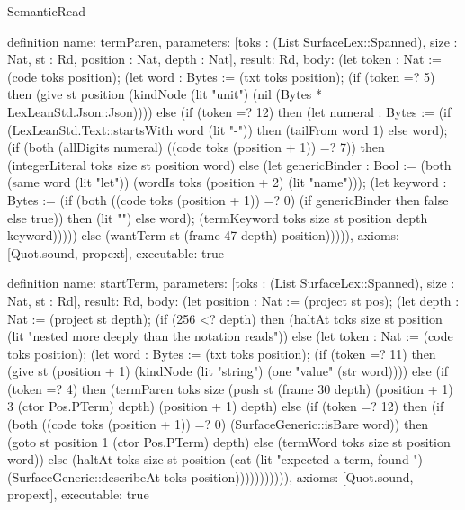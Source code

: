 \begin{lexlean}{SemanticRead}
\begin{semanticmodule}
{definition{
  name: termParen,
  parameters: [toks : (List SurfaceLex::Spanned), size : Nat, st : Rd, position : Nat, depth : Nat],
  result: Rd,
  body: (let token : Nat := (code toks position); (let word : Bytes := (txt toks position); (if (token =? 5) then (give st position (kindNode (lit "unit") (nil (Bytes * LexLeanStd.Json::Json)))) else (if (token =? 12) then (let numeral : Bytes := (if (LexLeanStd.Text::startsWith word (lit "-")) then (tailFrom word 1) else word); (if (both (allDigits numeral) ((code toks (position + 1)) =? 7)) then (integerLiteral toks size st position word) else (let genericBinder : Bool := (both (same word (lit "let")) (wordIs toks (position + 2) (lit "name"))); (let keyword : Bytes := (if (both ((code toks (position + 1)) =? 0) (if genericBinder then false else true)) then (lit "") else word); (termKeyword toks size st position depth keyword))))) else (wantTerm st (frame 47 depth) position))))),
  axioms: [Quot.sound, propext],
  executable: true
}

definition{
  name: startTerm,
  parameters: [toks : (List SurfaceLex::Spanned), size : Nat, st : Rd],
  result: Rd,
  body: (let position : Nat := (project st pos); (let depth : Nat := (project st depth); (if (256 <? depth) then (haltAt toks size st position (lit "nested more deeply than the notation reads")) else (let token : Nat := (code toks position); (let word : Bytes := (txt toks position); (if (token =? 11) then (give st (position + 1) (kindNode (lit "string") (one "value" (str word)))) else (if (token =? 4) then (termParen toks size (push st (frame 30 depth) (position + 1) 3 (ctor Pos.PTerm) depth) (position + 1) depth) else (if (token =? 12) then (if (both ((code toks (position + 1)) =? 0) (SurfaceGeneric::isBare word)) then (goto st position 1 (ctor Pos.PTerm) depth) else (termWord toks size st position word)) else (haltAt toks size st position (cat (lit "expected a term, found ") (SurfaceGeneric::describeAt toks position))))))))))),
  axioms: [Quot.sound, propext],
  executable: true
}

}
\end{semanticmodule}
\end{lexlean}
